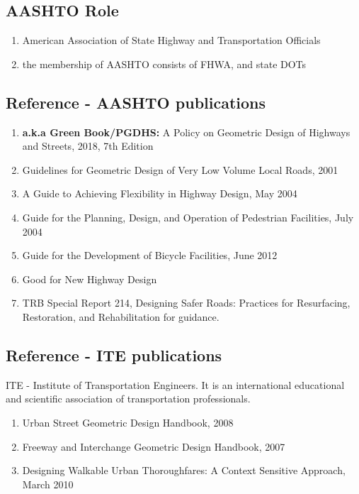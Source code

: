 \documentclass{article}
\begin{document}
  \subsection{AASHTO Role}
  \begin{enumerate}
    \item American Association of State Highway and Transportation Officials
    \item the membership of AASHTO consists of FHWA, and state DOTs
  \end{enumerate}

  \subsection{Reference - AASHTO publications}
  \begin{enumerate}
    \item \textbf{a.k.a Green Book/PGDHS:} A Policy on Geometric Design of Highways and Streets, 2018, 7th Edition
    \item Guidelines for Geometric Design of Very Low Volume Local Roads, 2001
    \item A Guide to Achieving Flexibility in Highway Design, May 2004
    \item Guide for the Planning, Design, and Operation of Pedestrian Facilities, July 2004
    \item Guide for the Development of Bicycle Facilities, June 2012

    \item Good for New Highway Design 
    \item TRB Special Report 214, Designing Safer Roads: Practices for Resurfacing, Restoration, and Rehabilitation for guidance. \\
  \end{enumerate}

  \subsection{Reference - ITE publications}
  ITE - Institute of Transportation Engineers. It is an international educational and scientific association of transportation professionals.\\
  \begin{enumerate}
    \item Urban Street Geometric Design Handbook, 2008
    \item Freeway and Interchange Geometric Design Handbook, 2007
    \item Designing Walkable Urban Thoroughfares: A Context Sensitive Approach, March 2010
  \end{enumerate}
\end{document}
